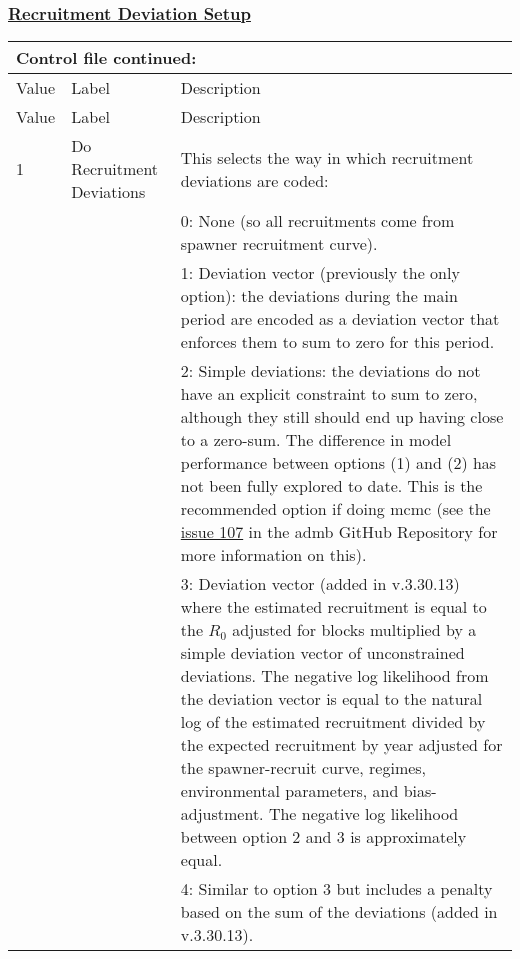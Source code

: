 \subsubsection[Recruitment Deviation Setup]{\protect\hyperlink{RecDevSetup}{Recruitment Deviation Setup}}
\begin{longtable}{p{1cm} p{3cm} p{12cm}}
	\multicolumn{3}{l}{Control file continued:} \\

	\hline
	Value & Label & Description \Tstrut\Bstrut\\
	\hline
	\endfirsthead

	\hline
	Value & Label & Description \Tstrut\Bstrut\\
	\hline
	\endhead
	\hline
	\endfoot
	\endlastfoot


	1 \Tstrut & Do Recruitment Deviations & This selects the way in which recruitment deviations are coded: \\
	  & & 0: None (so all recruitments come from spawner recruitment curve). \\
	  & & 1: Deviation vector (previously the only option): the deviations during the main period are encoded as a deviation vector that enforces them to sum to zero for this period. \\
	  & & 2: Simple deviations: the deviations do not have an explicit constraint to sum to zero, although they still should end up having close to a zero-sum. The difference in model performance between options (1) and (2) has not been fully explored to date. This is the recommended option if doing \gls{mcmc} (see the \href{https://github.com/admb-project/admb/issues/107}{issue 107} in the \gls{admb} GitHub Repository for more information on this). \\
	  & & 3: Deviation vector (added in v.3.30.13) where the estimated recruitment is equal to the $R_{0}$ adjusted for blocks multiplied by a simple deviation vector of unconstrained deviations. The negative log likelihood from the deviation vector is equal to the natural log of the estimated recruitment divided by the expected recruitment by year adjusted for the spawner-recruit curve, regimes, environmental parameters, and bias-adjustment. The negative log likelihood between option 2 and 3 is approximately equal. \\
	  & & 4: Similar to option 3 but includes a penalty based on the sum of the deviations (added in v.3.30.13). \\
	\hline


\end{longtable}

